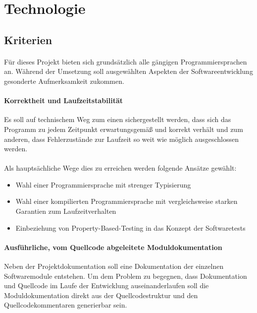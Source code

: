 \section{Technologie}
\subsection{Kriterien}
\paragraph{}
Für dieses Projekt bieten sich grundsätzlich alle gängigen Programmiersprachen
an. Während der Umsetzung soll ausgewählten Aspekten der Softwareentwicklung
gesonderte Aufmerksamkeit zukommen.

\paragraph{Korrektheit und Laufzeitstabilität} Es soll auf technischem Weg zum
einen sichergestellt werden, dass sich das Programm zu jedem Zeitpunkt erwartungsgemäß
und korrekt verhält und zum anderen, dass Fehlerzustände zur Laufzeit so weit
wie möglich ausgeschlossen werden.

\paragraph{}
Als hauptsächliche Wege dies zu erreichen werden folgende Ansätze gewählt:

\begin{itemize}
    \item Wahl einer Programmiersprache mit strenger Typisierung
    \item Wahl einer kompilierten Programmiersprache mit vergleichsweise starken
          Garantien zum Laufzeitverhalten
    \item Einbeziehung von \gls{Property-Based-Testing} \cite{property-based-testing} in das Konzept der Softwaretests
\end{itemize}

\paragraph{Ausführliche, vom Quellcode abgeleitete Moduldokumentation}
Neben der Projektdokumentation soll eine Dokumentation der einzelnen
Softwaremodule entstehen. Um dem Problem zu begegnen, dass Dokumentation und
Quellcode im Laufe der Entwicklung auseinanderlaufen soll die Moduldokumentation
direkt aus der Quellcodestruktur und den Quellcodekommentaren generierbar sein.

